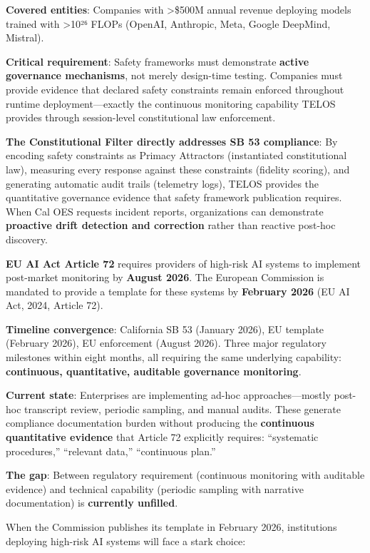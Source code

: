 \textbf{Covered entities}: Companies with \textgreater\$500M annual
revenue deploying models trained with \textgreater10²⁶ FLOPs (OpenAI,
Anthropic, Meta, Google DeepMind, Mistral).

\textbf{Critical requirement}: Safety frameworks must demonstrate
\textbf{active governance mechanisms}, not merely design-time testing.
Companies must provide evidence that declared safety constraints remain
enforced throughout runtime deployment---exactly the continuous
monitoring capability TELOS provides through session-level
constitutional law enforcement.

\textbf{The Constitutional Filter directly addresses SB 53 compliance}:
By encoding safety constraints as Primacy Attractors (instantiated
constitutional law), measuring every response against these constraints
(fidelity scoring), and generating automatic audit trails (telemetry
logs), TELOS provides the quantitative governance evidence that safety
framework publication requires. When Cal OES requests incident reports,
organizations can demonstrate \textbf{proactive drift detection and
correction} rather than reactive post-hoc discovery.

\textbf{EU AI Act Article 72} requires providers of high-risk AI systems
to implement post-market monitoring by \textbf{August 2026}. The
European Commission is mandated to provide a template for these systems
by \textbf{February 2026} (EU AI Act, 2024, Article 72).

\textbf{Timeline convergence}: California SB 53 (January 2026), EU
template (February 2026), EU enforcement (August 2026). Three major
regulatory milestones within eight months, all requiring the same
underlying capability: \textbf{continuous, quantitative, auditable
governance monitoring}.

\textbf{Current state}: Enterprises are implementing ad-hoc
approaches---mostly post-hoc transcript review, periodic sampling, and
manual audits. These generate compliance documentation burden without
producing the \textbf{continuous quantitative evidence} that Article 72
explicitly requires: ``systematic procedures,'' ``relevant data,''
``continuous plan.''

\textbf{The gap}: Between regulatory requirement (continuous monitoring
with auditable evidence) and technical capability (periodic sampling
with narrative documentation) is \textbf{currently unfilled}.

When the Commission publishes its template in February 2026,
institutions deploying high-risk AI systems will face a stark choice:

